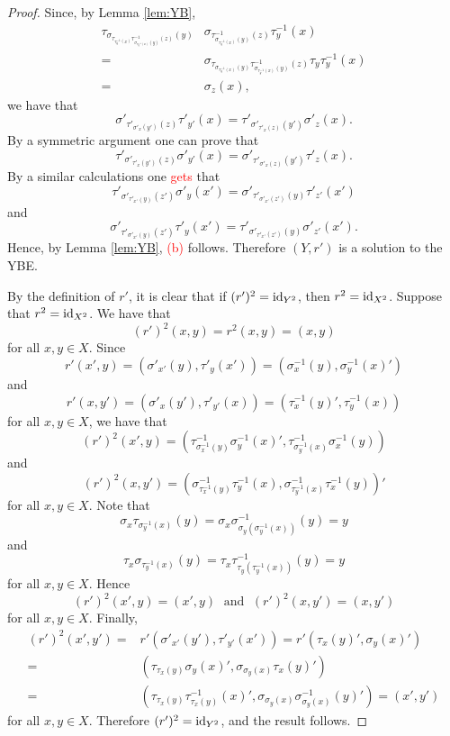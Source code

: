 \begin{proof}
Since, by Lemma \ref{lem:YB},
\begin{align*}
\tau_{\sigma_{\tau_{\tau^{-1}_y(x)}\tau^{-1}_{\sigma_{\tau^{-1}_y(x)}(y)}(z)}(y)}&\sigma_{\tau^{-1}_{\sigma_{\tau^{-1}_y(x)}(y)}(z)}\tau^{-1}_y(x)\\
=&\sigma_{\tau_{\sigma_{\tau^{-1}_y(x)}(y)}\tau^{-1}_{\sigma_{\tau^{-1}_y(x)}(y)}(z)} \tau_y{\tau^{-1}_y}(x)\\
=&\sigma_z(x), 
\end{align*}
we have that
\[\sigma'_{\tau'_{\sigma'_x(y')}(z)}\tau'_{y'}(x)=\tau'_{\sigma'_{\tau'_x(z)}(y')}\sigma'_{z}(x).\]
By a symmetric argument one can prove that
\[\tau'_{\sigma'_{\tau'_x(y')}(z)}\sigma'_{y'}(x)=\sigma'_{\tau'_{\sigma'_x(z)}(y')}\tau'_{z}(x).\]
By a similar calculations one \textcolor{red}{gets} that
\[\tau'_{\sigma'_{\tau'_{x'}(y)}(z')}\sigma'_{y}(x')=\sigma'_{\tau'_{\sigma'_{x'}(z')}(y)}\tau'_{z'}(x')\]
and
\[\sigma'_{\tau'_{\sigma'_{x'}(y)}(z')}\tau'_{y}(x')=\tau'_{\sigma'_{\tau'_{x'}(z')}(y)}\sigma'_{z'}(x').\]
Hence, by Lemma \ref{lem:YB}, \textcolor{red}{(b)} follows. Therefore $(Y,r')$ is a solution to the YBE. 

By the definition of $r'$, it is clear that if $(r')^2=\operatorname{id}_{Y^2}$, then $r^2=\operatorname{id}_{X^2}$. Suppose that $r^2=\operatorname{id}_{X^2}$. We have that
\[ (r')^2(x,y)=r^2(x,y)=(x,y)\]
for all $x,y\in X$. Since
\[ r'(x',y)=(\sigma'_{x'}(y),\tau'_y(x'))=(\sigma^{-1}_x(y),\sigma^{-1}_y(x)')\]
and 
\[ r'(x,y')=(\sigma'_{x}(y'),\tau'_{y'}(x))=(\tau^{-1}_x(y)',\tau^{-1}_y(x))\]
for all $x,y\in X$, we have that
\[ (r')^2(x',y)=(\tau^{-1}_{\sigma^{-1}_x(y)}\sigma^{-1}_y(x)',\tau^{-1}_{\sigma^{-1}_y(x)}\sigma^{-1}_x(y))\]
and
\[ (r')^2(x,y')=(\sigma^{-1}_{\tau^{-1}_x(y)}\tau^{-1}_y(x),\sigma^{-1}_{\tau^{-1}_y(x)}\tau^{-1}_x(y))'\]
for all $x,y\in X$. Note that
\[\sigma_x\tau_{\sigma^{-1}_y(x)}(y)=\sigma_x\sigma^{-1}_{\sigma_y(\sigma^{-1}_y(x))}(y)=y\]
and
\[
\tau_x\sigma_{\tau^{-1}_y(x)}(y)=\tau_x\tau^{-1}_{\tau_y(\tau^{-1}_y(x))}(y)=y
\]
for all $x,y\in X$. Hence
\[ 
(r')^2(x',y)=(x',y)\; \text{ and }\; (r')^2(x,y')=(x,y')
\]
for all $x,y\in X$.
Finally, 
\begin{align*}
(r')^2(x',y')=&r'(\sigma'_{x'}(y'),\tau'_{y'}(x'))
=r'(\tau_x(y)',\sigma_y(x)')\\
=&(\tau_{\tau_{x}(y)}\sigma_y(x)',\sigma_{\sigma_y(x)}\tau_x(y)')\\
=&(\tau_{\tau_{x}(y)}\tau^{-1}_{\tau_x(y)}(x)',\sigma_{\sigma_y(x)}\sigma^{-1}_{\sigma_y(x)}(y)')=(x',y')
\end{align*}
for all $x,y\in X$. Therefore $(r')^2=\operatorname{id}_{Y^2}$, and the result follows.
\end{proof}

